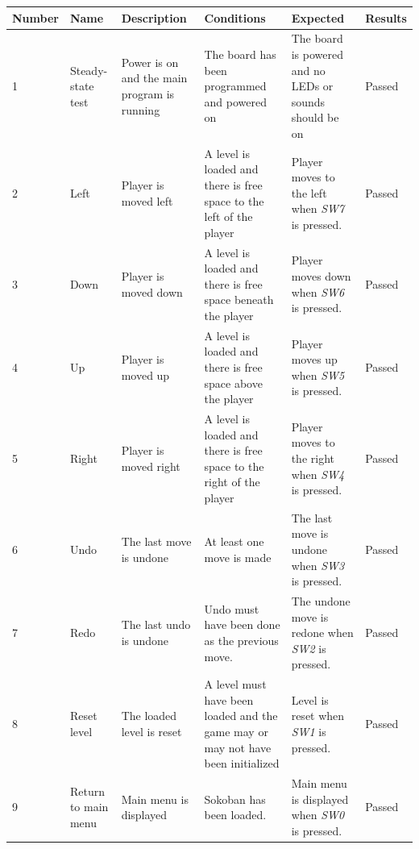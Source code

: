 \documentclass[a4paper,11pt]{article}
\renewcommand{\arraystretch}{1.25} %
\begin{document}
\begin{center}
\scriptsize
\renewcommand{\arraystretch}{1.25} %
\begin{tabular}[pos]{|m{35pt}|m{45pt}|m{80pt}|m{90pt}|m{105pt}|m{40pt}|}
\hline \textbf{Number} & \textbf{Name} & \textbf{Description} & \textbf{Conditions} & \textbf{Expected} & \textbf{Results} \\ 

\hline 1 & Steady-state test & Power is on and the main program is running & The board has been programmed and powered on & The board is powered and no LEDs or sounds should be on & Passed \\

\hline 2 & Left & Player is moved left & A level is loaded and there is free space to the left of the player & Player moves to the left when \emph{SW7} is pressed.  & Passed \\

\hline 3 & Down & Player is moved down & A level is loaded and there is free space beneath the player & Player moves down when \emph{SW6} is pressed.  & Passed \\

\hline 4 & Up & Player is moved up & A level is loaded and there is free space above the player & Player moves up when \emph{SW5} is pressed.  & Passed \\

\hline 5 & Right & Player is moved right & A level is loaded and there is free space to the right of the player & Player moves to the right when \emph{SW4} is pressed.  & Passed \\

\hline 6 & Undo & The last move is undone & At least one move is made & The last move is undone when \emph{SW3} is pressed.  & Passed \\

\hline 7 & Redo & The last undo is undone & Undo must have been done as the previous move. & The undone move is redone when \emph{SW2} is pressed.  & Passed \\

\hline 8 &  Reset level & The loaded level is reset & A level must have been loaded and the game may or may not have been initialized & Level is reset when \emph{SW1} is pressed.  & Passed \\

\hline 9 & Return to main menu & Main menu is displayed & Sokoban has been loaded. & Main menu is displayed when \emph{SW0} is pressed.  & Passed \\


\end{tabular}
\end{center}
\end{document}
